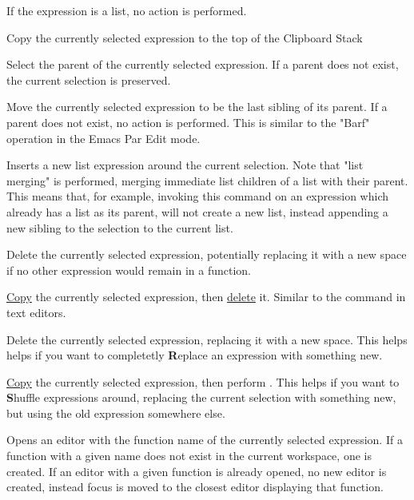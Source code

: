 If the expression is a list, no action is performed.


Copy the currently selected expression to the top of the Clipboard Stack

Select the parent of the currently selected expression. If a parent does not
exist, the current selection is preserved.

Move the currently selected expression to be the last sibling of its parent.
If a parent does not exist, no action is performed.
This is similar to the "Barf" operation in the Emacs Par Edit mode.


Inserts a new list expression around the current selection. Note that "list
merging" is performed, merging immediate list children of a list with their
parent. This means that, for example, invoking this command on an expression
which already has a list as its parent, will not create a new list, instead
appending a new sibling to the selection to the current list.

Delete the currently selected expression, potentially replacing it with a new
space if no other expression would remain in a function.


\hyperref[cmd:copy]{Copy} the currently selected expression, then
\hyperref[cmd:delete]{delete} it. Similar to the  command in
text editors.


Delete the currently selected expression, replacing it with a new space. This
helps helps if you want to completetly \textbf{R}eplace an expression with
something new.

\hyperref[cmd:copy]{Copy} the currently selected expression, then perform
\hyperref[cmd:delete_blank]{}. This helps if you want
to \textbf{S}huffle expressions around, replacing the current selection with
something new, but using the old expression somewhere else.

Opens an editor with the function name of the currently selected expression.
If a function with a given name does not exist in the current workspace, one is
created.
If an editor with a given function is already opened, no new editor is created,
instead focus is moved to the closest editor displaying that function.


